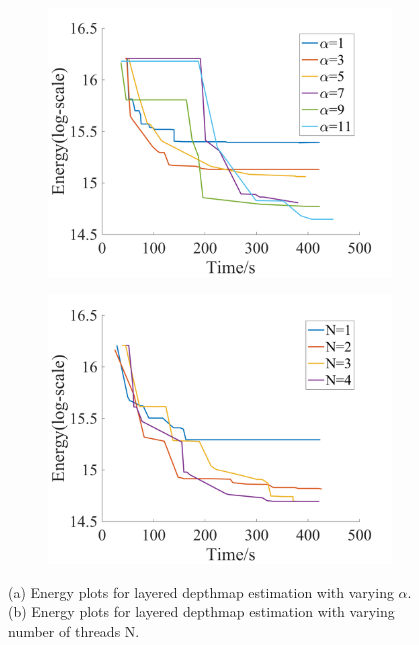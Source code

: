 \begin{figure}[!h]
  \centering
  \begin{subfigure}[b]{0.49\columnwidth}
    \centering
    \includegraphics[width=\columnwidth]{figure/layered_depthmap_by_alpha.png}
    \caption{}
    \label{fig:layered_depthmap_by_alpha}
  \end{subfigure}  
  \begin{subfigure}[b]{0.49\columnwidth}
    \centering
    \includegraphics[width=\columnwidth]{figure/layered_depthmap_by_N.png}
    \caption{}
    \label{fig:layered_depthmap_by_N}
  \end{subfigure}
  \caption{(a) Energy plots for layered depthmap estimation with varying
    $\alpha$. (b) Energy plots for layered depthmap estimation with varying number of threads N.}
  \label{fig:layered_depthmap_by_alpha_N}
\end{figure}



